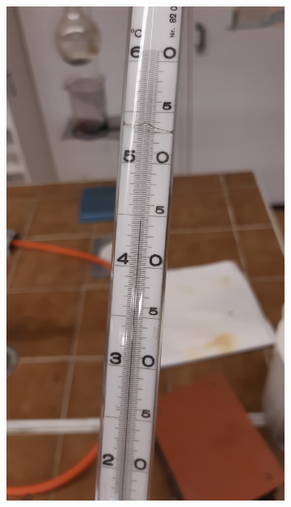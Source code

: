 \documentclass[12pt]{article}
\begin{document}
\begin{figure}[h!]
    \begin{subfigure}[b]{.5\textwidth}
        \includegraphics[angle = 270, width = \textwidth]{prilohy/teploměr_1.jpg}
    \end{subfigure}
    \hfill
    \begin{subfigure}[b]{.5\textwidth}

\end{subfigure}
\end{figure}
\end{document}
